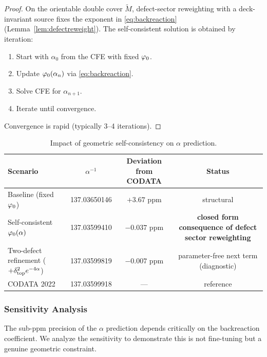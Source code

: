 \begin{proof}
On the orientable double cover $\widetilde{M}$, defect-sector reweighting with a
deck-invariant source fixes the exponent in \eqref{eq:backreaction}
(Lemma~\ref{lem:defectreweight}). The self-consistent solution is obtained by iteration:
\begin{enumerate}
    \item Start with $\alpha_0$ from the CFE with fixed $\varphi_0$.
    \item Update $\varphi_0(\alpha_n)$ via \eqref{eq:backreaction}.
    \item Solve CFE for $\alpha_{n+1}$.
    \item Iterate until convergence.
\end{enumerate}
Convergence is rapid (typically 3--4 iterations).
\end{proof}

\begin{table}[H]
\centering
\begin{tabular}{@{}lccc@{}}
\toprule
\textbf{Scenario} & $\alpha^{-1}$ & \textbf{Deviation from CODATA} & \textbf{Status}\\
\midrule
Baseline (fixed $\varphi_0$) & 137.03650146 & $+3.67$ ppm & structural\\
Self-consistent $\varphi_0(\alpha)$ & 137.03599410 & $-0.037$ ppm & \textbf{closed form consequence of defect sector reweighting}\\
Two-defect refinement ($+\delta_{\mathrm{top}}^2 e^{-4\alpha}$) & 137.03599819 & $-0.007$ ppm & parameter-free next term (diagnostic)\\
CODATA 2022 & 137.03599918 & --- & reference\\
\bottomrule
\end{tabular}
\caption{Impact of geometric self-consistency on $\alpha$ prediction.}
\label{tab:alpha}
\end{table}

\subsubsection{Sensitivity Analysis}
\label{sec:sensitivity}

The sub-ppm precision of the $\alpha$ prediction depends critically on the backreaction 
coefficient. We analyze the sensitivity to demonstrate this is not fine-tuning but 
a genuine geometric constraint.

